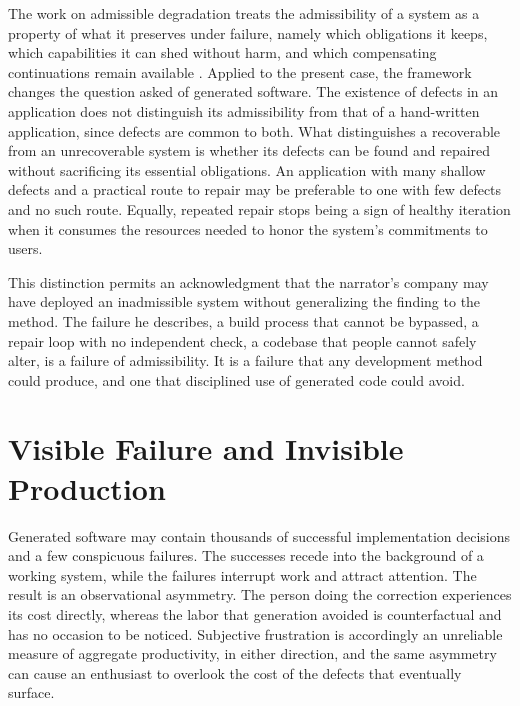 \documentclass[11pt]{article}
\theoremstyle{remark}
\begin{document}
The work on admissible degradation treats the admissibility of a system as a property of what it preserves under failure, namely which obligations it keeps, which capabilities it can shed without harm, and which compensating continuations remain available \cite{flyxion_degrade}. Applied to the present case, the framework changes the question asked of generated software. The existence of defects in an application does not distinguish its admissibility from that of a hand-written application, since defects are common to both. What distinguishes a recoverable from an unrecoverable system is whether its defects can be found and repaired without sacrificing its essential obligations. An application with many shallow defects and a practical route to repair may be preferable to one with few defects and no such route. Equally, repeated repair stops being a sign of healthy iteration when it consumes the resources needed to honor the system's commitments to users.

This distinction permits an acknowledgment that the narrator's company may have deployed an inadmissible system without generalizing the finding to the method. The failure he describes, a build process that cannot be bypassed, a repair loop with no independent check, a codebase that people cannot safely alter, is a failure of admissibility. It is a failure that any development method could produce, and one that disciplined use of generated code could avoid.

\section{Visible Failure and Invisible Production}

Generated software may contain thousands of successful implementation decisions and a few conspicuous failures. The successes recede into the background of a working system, while the failures interrupt work and attract attention. The result is an observational asymmetry. The person doing the correction experiences its cost directly, whereas the labor that generation avoided is counterfactual and has no occasion to be noticed. Subjective frustration is accordingly an unreliable measure of aggregate productivity, in either direction, and the same asymmetry can cause an enthusiast to overlook the cost of the defects that eventually surface.
\end{document}
